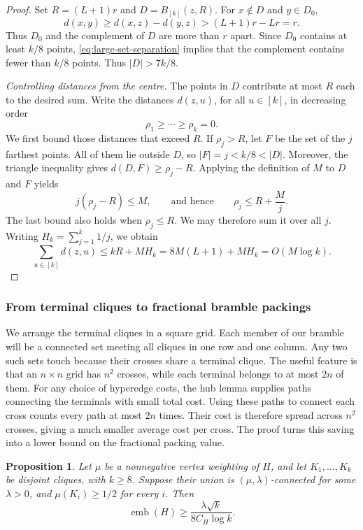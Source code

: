 \documentclass[11pt,letterpaper]{article}
\newtheorem{proposition}[proposition]{Proposition}
\theoremstyle{definition}
\theoremstyle{remark}
\newcommand{\emb}{\operatorname{emb}}
\begin{document}
\begin{proof}
Set $R=(L+1)r$ and $D=B_{[k]}(z,R)$. For $x\notin D$ and $y\in D_0$,
\[
 d(x,y)\ge d(x,z)-d(y,z)>(L+1)r-Lr=r.
\]
Thus $D_0$ and the complement of $D$ are more than $r$ apart.
Since $D_0$ contains at least $k/8$ points,
\eqref{eq:large-set-separation} implies that the complement contains
fewer than $k/8$ points. Thus $|D|>7k/8$.

\smallskip
\textit{Controlling distances from the centre.}
The points in $D$ contribute at most $R$ each to the desired sum.
Write the distances $d(z,u)$, for all $u\in[k]$, in decreasing order
\[
 \rho_1\ge\cdots\ge\rho_k=0.
\]
We first bound those distances that exceed $R$.
If $\rho_j>R$, let $F$ be the set of the $j$ farthest points. All of
them lie outside $D$, so $|F|=j<k/8<|D|$. Moreover, the triangle
inequality gives $d(D,F)\ge\rho_j-R$. Applying the definition of $M$
to $D$ and $F$ yields
\[
 j(\rho_j-R)\le M,\qquad\text{and hence}\qquad
 \rho_j\le R+\frac{M}{j}.
\]
The last bound also holds when $\rho_j\le R$. We may therefore sum it
over all $j$. Writing $H_k=\sum_{j=1}^k1/j$, we obtain
\[
 \sum_{u\in[k]}d(z,u)
 \le kR+MH_k
 =8M(L+1)+MH_k
 =O(M\log k).
\]
\end{proof}

\subsubsection{From terminal cliques to fractional bramble packings}\label{sec:lift}

We arrange the terminal cliques in a square grid. Each member of our
bramble will be a connected set meeting all cliques in one row and one
column. Any two such sets touch because their crosses share a terminal
clique. The useful feature is that an $n\times n$ grid has $n^2$ crosses,
while each terminal belongs to at most $2n$ of them. For any choice of
hyperedge costs, the hub lemma supplies paths connecting the terminals
with small total cost. Using these paths to connect each cross counts
every path at most $2n$ times. Their cost is therefore spread across
$n^2$ crosses, giving a much smaller average cost per cross. The proof
turns this saving into a lower bound on the fractional packing value.

\begin{proposition}\label{prop:terminal-embedding}
Let $\mu$ be a nonnegative vertex weighting of $H$, and let
$K_1,\ldots,K_k$ be disjoint cliques, with $k\ge8$.
Suppose their union is $(\mu,\lambda)$-connected for some $\lambda>0$,
and $\mu(K_i)\ge1/2$ for every $i$.
Then
\begin{equation}\label{eq:lift}
 \emb(H)\ge\frac{\lambda\sqrt{k}}{8C_H\log k}.
\end{equation}
\end{proposition}
\end{document}
